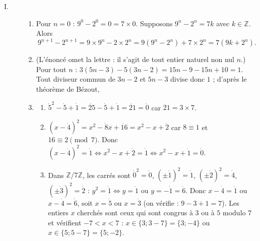 \begin{description}
	\item[I. ]
	\begin{enumerate}
		\item {}
			Pour $n = 0$ : $9^0 - 2^0 = 0 = 7 \times 0$.
			Supposons $9^n - 2^n = 7k$ avec $k \in \mathbb{Z}$. Alors
			\[
				9^{n+1} - 2^{n+1} = 9 \times 9^n - 2 \times 2^n = 9\left(9^n - 2^n\right) + 7 \times 2^n = 7\left(9k + 2^n\right) .
			\]
			\par\noindent{}
		\item {}
			(L'énoncé omet la lettre : il s'agit de tout entier naturel non nul $n$.)
			Pour tout $n$ : $3(5n - 3) - 5(3n - 2) = 15n - 9 - 15n + 10 = 1$.
			Tout diviseur commun de $3n-2$ et $5n-3$ divise donc $1$ ; d'après le théorème de Bézout,
			\par\noindent{}
		\item
		\begin{enumerate}
			\item {}
				$\dot{5}^2 - \dot{5} + \dot{1} = \dot{25} - \dot{5} + \dot{1} = \dot{21} = \dot{0}$ car $21 = 3 \times 7$.
				\par\noindent{}
			\item {}
				$(x - \dot{4})^2 = x^2 - \dot{8}x + \dot{16} = x^2 - x + \dot{2}$ car $8 \equiv 1$ et $16 \equiv 2 \pmod 7$.
				Donc $(x - \dot{4})^2 = \dot{1} \iff x^2 - x + \dot{2} = \dot{1} \iff x^2 - x + \dot{1} = \dot{0}$.
				\par\noindent{}
			\item {}
				Dans $\mathbb{Z}/7\mathbb{Z}$, les carrés sont $\dot{0}^2 = \dot{0}$, $(\pm\dot{1})^2 = \dot{1}$, $(\pm\dot{2})^2 = \dot{4}$, $(\pm\dot{3})^2 = \dot{2}$ :
				$y^2 = \dot{1} \iff y = \dot{1}$ ou $y = -\dot{1} = \dot{6}$.
				Donc $x - \dot{4} = \dot{1}$ ou $x - \dot{4} = \dot{6}$, soit $x = \dot{5}$ ou $x = \dot{3}$ (on vérifie : $9 - 3 + 1 = 7$).
				Les entiers $x$ cherchés sont ceux qui sont congrus à $3$ ou à $5$ modulo $7$ et vérifient $-7 < x < 7$ :
				$x \in \{3 ; 3 - 7\} = \{3 ; -4\}$ ou $x \in \{5 ; 5 - 7\} = \{5 ; -2\}$.
				\par\noindent{}
		\end{enumerate}

\end{enumerate}
\end{description}
